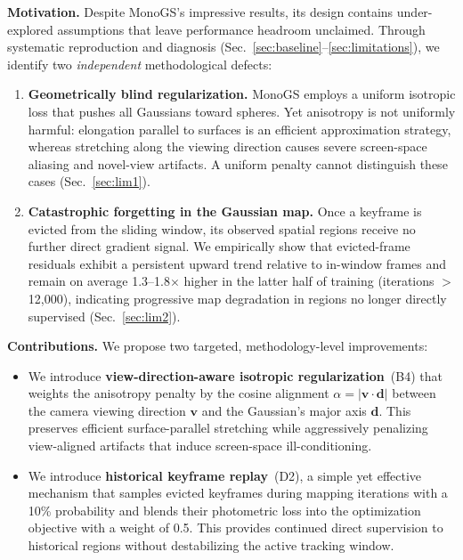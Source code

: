 \documentclass[conference]{IEEEtran}
\begin{document}
\textbf{Motivation.}
Despite MonoGS's impressive results, its design contains under-explored assumptions that leave performance headroom unclaimed.
Through systematic reproduction and diagnosis (Sec.~\ref{sec:baseline}--\ref{sec:limitations}), we identify two \textit{independent} methodological defects:
\begin{enumerate}
    \item \textbf{Geometrically blind regularization.}
    MonoGS employs a uniform isotropic loss that pushes all Gaussians toward spheres.
    Yet anisotropy is not uniformly harmful: elongation parallel to surfaces is an efficient approximation strategy, whereas stretching along the viewing direction causes severe screen-space aliasing and novel-view artifacts.
    A uniform penalty cannot distinguish these cases (Sec.~\ref{sec:lim1}).

    \item \textbf{Catastrophic forgetting in the Gaussian map.}
    Once a keyframe is evicted from the sliding window, its observed spatial regions receive no further direct gradient signal.
    We empirically show that evicted-frame residuals exhibit a persistent upward trend relative to in-window frames and remain on average 1.3--1.8$\times$ higher in the latter half of training (iterations $>$12{,}000), indicating progressive map degradation in regions no longer directly supervised (Sec.~\ref{sec:lim2}).
\end{enumerate}

\textbf{Contributions.}
We propose two targeted, methodology-level improvements:
\begin{itemize}
    \item We introduce \textbf{view-direction-aware isotropic regularization}~({B4}) that weights the anisotropy penalty by the cosine alignment $\alpha = |\mathbf{v} \cdot \mathbf{d}|$ between the camera viewing direction $\mathbf{v}$ and the Gaussian's major axis $\mathbf{d}$.
    This preserves efficient surface-parallel stretching while aggressively penalizing view-aligned artifacts that induce screen-space ill-conditioning.

    \item We introduce \textbf{historical keyframe replay}~({D2}), a simple yet effective mechanism that samples evicted keyframes during mapping iterations with a 10\% probability and blends their photometric loss into the optimization objective with a weight of 0.5.
    This provides continued direct supervision to historical regions without destabilizing the active tracking window.
\end{itemize}
\end{document}
